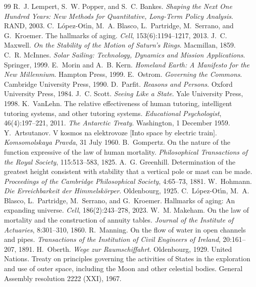 \begin{thebibliography}{99}
 R.~J. Lempert, S.~W. Popper, and S.~C. Bankes. \emph{Shaping the Next One Hundred Years: New Methods for Quantitative, Long-Term Policy Analysis}. RAND, 2003.
 C.~L{\'o}pez-Ot{\'\i}n, M.~A. Blasco, L.~Partridge, M.~Serrano, and G.~Kroemer. The hallmarks of aging. \emph{Cell}, 153(6):1194--1217, 2013.
 J.~C. Maxwell. \emph{On the Stability of the Motion of Saturn's Rings}. Macmillan, 1859.
 C.~R. McInnes. \emph{Solar Sailing: Technology, Dynamics and Mission Applications}. Springer, 1999.
 E.~Morin and A.~B. Kern. \emph{Homeland Earth: A Manifesto for the New Millennium}. Hampton Press, 1999.
 E.~Ostrom. \emph{Governing the Commons}. Cambridge University Press, 1990.
 D.~Parfit. \emph{Reasons and Persons}. Oxford University Press, 1984.
 J.~C. Scott. \emph{Seeing Like a State}. Yale University Press, 1998.
 K.~VanLehn. The relative effectiveness of human tutoring, intelligent tutoring systems, and other tutoring systems. \emph{Educational Psychologist}, 46(4):197--221, 2011.
 \emph{The Antarctic Treaty}. Washington, 1 December 1959.
 Y.~Artsutanov. V kosmos na elektrovoze [Into space by electric train]. \emph{Komsomolskaya Pravda}, 31 July 1960.
 B.~Gompertz. On the nature of the function expressive of the law of human mortality. \emph{Philosophical Transactions of the Royal Society}, 115:513--583, 1825.
 A.~G. Greenhill. Determination of the greatest height consistent with stability that a vertical pole or mast can be made. \emph{Proceedings of the Cambridge Philosophical Society}, 4:65--73, 1881.
 W.~Hohmann. \emph{Die Erreichbarkeit der Himmelsk\"orper}. Oldenbourg, 1925.
 C.~L{\'o}pez-Ot{\'\i}n, M.~A. Blasco, L.~Partridge, M.~Serrano, and G.~Kroemer. Hallmarks of aging: An expanding universe. \emph{Cell}, 186(2):243--278, 2023.
 W.~M. Makeham. On the law of mortality and the construction of annuity tables. \emph{Journal of the Institute of Actuaries}, 8:301--310, 1860.
 R.~Manning. On the flow of water in open channels and pipes. \emph{Transactions of the Institution of Civil Engineers of Ireland}, 20:161--207, 1891.
 H.~Oberth. \emph{Wege zur Raumschiffahrt}. Oldenbourg, 1929.
 United Nations. Treaty on principles governing the activities of States in the exploration and use of outer space, including the Moon and other celestial bodies. General Assembly resolution 2222 (XXI), 1967.

\end{thebibliography}
